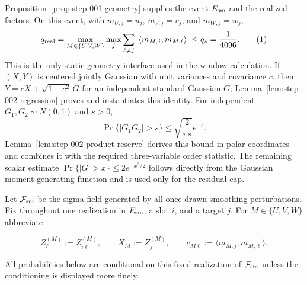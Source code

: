 Proposition~\ref{prop:step-001-geometry} supplies the event $E_{\rm sm}$ and
the realized factors. On this event, with
$m_{U,j}=u_j$, $m_{V,j}=v_j$, and $m_{W,j}=w_j$,
\[
q_{\rm real}
=\max_{M\in\{U,V,W\}}\max_j
 \sum_{\ell\ne j}|\langle m_{M,j},m_{M,\ell}\rangle|
\le q_*=\frac1{4096}.
\tag{1}
\]
This is the only static-geometry interface used in the window calculation.
If $(X,Y)$ is centered jointly Gaussian with unit variances and covariance
$c$, then $Y=cX+\sqrt{1-c^2}\,G$ for an independent standard Gaussian $G$;
Lemma~\ref{lem:step-002-regression} proves and instantiates this identity.
For independent $G_1,G_2\sim N(0,1)$ and $s>0$,
\[
\Pr\{|G_1G_2|>s\}\le \sqrt{\frac{2}{\pi s}}e^{-s}.
\tag{2}
\]
Lemma~\ref{lem:step-002-product-reserve} derives this bound in polar
coordinates and combines it with the required three-variable order statistic.
The remaining scalar estimate
$\Pr\{|G|>x\}\le2e^{-x^2/2}$ follows directly from the Gaussian moment
generating function and is used only for the residual cap.

Let $\mathcal F_{\rm sm}$ be the sigma-field generated by all once-drawn
smoothing perturbations. Fix throughout one realization in $E_{\rm sm}$, a
slot $i$, and a target $j$. For $M\in\{U,V,W\}$ abbreviate

\[
Z_{\ell}^{(M)}:=Z_{i\ell}^{(M)},\qquad
X_M:=Z_j^{(M)},\qquad
c_{M\ell}:=\langle m_{M,j},m_{M,\ell}\rangle .
\tag{3}
\]

All probabilities below are conditional on this fixed realization of
$\mathcal F_{\rm sm}$ unless the conditioning is displayed more finely.


